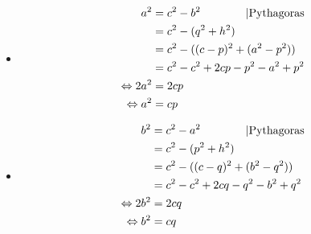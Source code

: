 \begin{Beweis}
  \begin{itemize}
    \item \begin{align*}
      a^2 &= c^2-b^2 \text{\qquad\qquad $|$Pythagoras}\\
      &= c^2 -(q^2+h^2)\\
      &= c^2 - ((c-p)^2+(a^2-p^2))\\
      &= c^2 - c^2+ 2cp -p^2 - a^2 + p^2\\
      \Leftrightarrow 2a^2&=2cp \\
      \Leftrightarrow a^2&=cp
    \end{align*}
    \item \begin{align*}
      b^2 &= c^2-a^2 \text{\qquad\qquad $|$Pythagoras}\\
      &= c^2 -(p^2+h^2)\\
      &= c^2 - ((c-q)^2+(b^2-q^2))\\
      &= c^2 - c^2+ 2cq -q^2 - b^2 + q^2\\
      \Leftrightarrow 2b^2&=2cq \\
      \Leftrightarrow b^2&=cq
    \end{align*}
  \end{itemize}
\end{Beweis}
